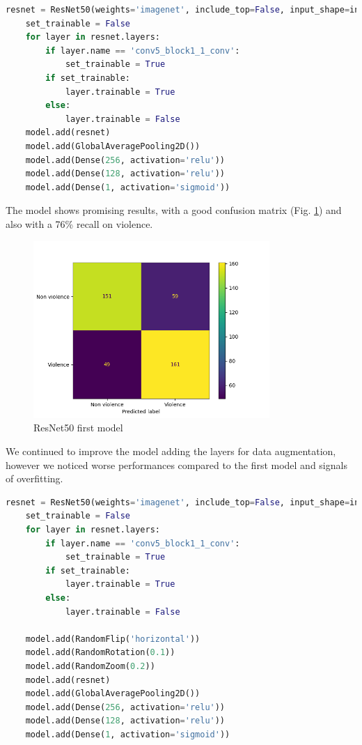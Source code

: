 \begin{lstlisting}[language=python, caption={ResNet50, first model}, label={lst:resnet50Code}]
    resnet = ResNet50(weights='imagenet', include_top=False, input_shape=input_shape)
    set_trainable = False
    for layer in resnet.layers:
        if layer.name == 'conv5_block1_1_conv':
            set_trainable = True
        if set_trainable:
            layer.trainable = True
        else:
            layer.trainable = False
    model.add(resnet)
    model.add(GlobalAveragePooling2D())
    model.add(Dense(256, activation='relu'))
    model.add(Dense(128, activation='relu'))
    model.add(Dense(1, activation='sigmoid'))
\end{lstlisting}

The model shows promising results, with a good confusion matrix (Fig. \ref{fig:ResNet2d1}) and also with a 76\% recall on violence.

\begin{figure}[H]
    \centering
    \includegraphics[width=0.8\textwidth]{images/731a-resnet2D1-86ad-conf_matrix.png}
    \caption{ResNet50 first model}
    \label{fig:ResNet2d1}
\end{figure}

We continued to improve the model adding the layers for data augmentation, however we noticed worse performances compared to the first model and signals of overfitting. 
\begin{lstlisting}[language=python, caption={ResNet50, second model code}, label={lst:resnet50CodeSecondTest}]
    resnet = ResNet50(weights='imagenet', include_top=False, input_shape=input_shape)
    set_trainable = False
    for layer in resnet.layers:
        if layer.name == 'conv5_block1_1_conv':
            set_trainable = True
        if set_trainable:
            layer.trainable = True
        else:
            layer.trainable = False

    model.add(RandomFlip('horizontal'))
    model.add(RandomRotation(0.1))
    model.add(RandomZoom(0.2))
    model.add(resnet)
    model.add(GlobalAveragePooling2D())
    model.add(Dense(256, activation='relu'))
    model.add(Dense(128, activation='relu'))
    model.add(Dense(1, activation='sigmoid'))
\end{lstlisting}

